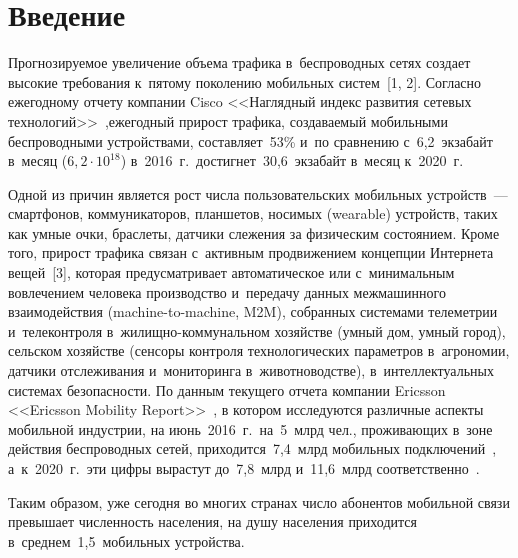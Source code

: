 \begin{multicols}{2}

\label{st\stat}

\section{Введение}

  Прогнозируемое увеличение объема трафика в~беспроводных сетях создает 
высокие требования к~пятому поколению мобильных систем~[1, 2]. 
Согласно ежегодному отчету компании Cisco <<Наглядный индекс развития 
сетевых технологий>>~\cite{1-gai},\linebreak ежегод\-ный прирост трафика, 
созда\-ва\-емый мобильными беспроводными устройствами, со\-став\-ля\-ет~53\% 
и~по сравнению с~6,2~экзабайт в~месяц ($6{,}2\cdot 10^{18}$) в~2016~г.\ 
достигнет~30,6~экзабайт в~месяц к~2020~г. 

Одной из причин является рост 
числа пользовательских мобильных устройств~--- смартфонов, 
коммуникаторов, планшетов, носимых (wearable) устройств, таких как умные 
очки, браслеты, датчики слежения за физическим состоянием. Кроме того, 
прирост трафика связан с~активным продвижением концепции Интернета 
вещей~[3], которая предусматривает автоматическое или с~минимальным 
вовлечением человека производство и~передачу данных межмашинного 
взаимодействия (machine-to-machine, M2M), собранных системами 
телеметрии и~телеконтроля в~жи\-лищ\-но-ком\-му\-наль\-ном хозяйстве (умный 
дом, умный город), сельском хозяйстве (сенсоры контроля технологических 
параметров в~агрономии, датчики отслеживания и~мониторинга 
в~животноводстве), в~интеллектуальных системах без\-опас\-ности. По данным 
текущего отчета компании Ericsson <<Ericsson Mobility Report>>~\cite{2-gai}, 
в котором исследуются различные аспекты мобильной индустрии, на 
июнь~2016~г.\ на~5~млрд чел., проживающих в~зоне действия 
беспроводных сетей, приходится~7,4~млрд мобильных  
подключений~\cite{2-gai}, а~к~2020~г.\ эти цифры вырастут до~7,8~млрд 
и~11,6~млрд соответственно~\cite{1-gai}. 

Таким образом, уже сегодня во 
многих странах число абонентов мобильной связи превышает численность 
населения, на душу населения приходится в~среднем~1,5~мобильных 
устройства. 
  

\end{multicols}
